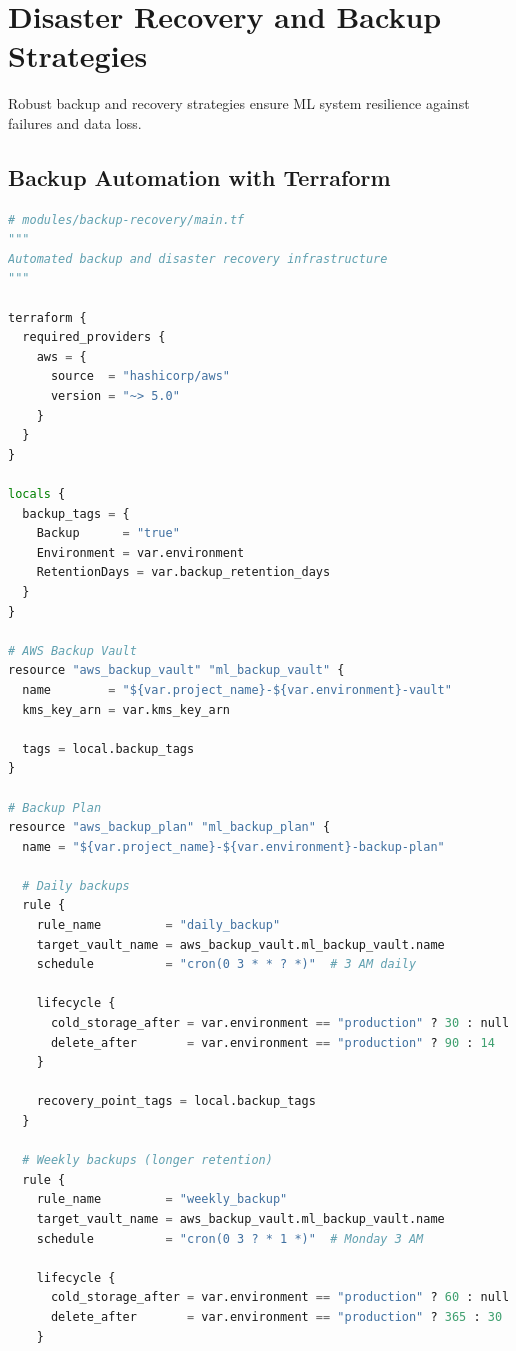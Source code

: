 \section{Disaster Recovery and Backup Strategies}

Robust backup and recovery strategies ensure ML system resilience against failures and data loss.

\subsection{Backup Automation with Terraform}

\begin{lstlisting}[language=Python, caption=Automated Backup Configuration]
# modules/backup-recovery/main.tf
"""
Automated backup and disaster recovery infrastructure
"""

terraform {
  required_providers {
    aws = {
      source  = "hashicorp/aws"
      version = "~> 5.0"
    }
  }
}

locals {
  backup_tags = {
    Backup      = "true"
    Environment = var.environment
    RetentionDays = var.backup_retention_days
  }
}

# AWS Backup Vault
resource "aws_backup_vault" "ml_backup_vault" {
  name        = "${var.project_name}-${var.environment}-vault"
  kms_key_arn = var.kms_key_arn

  tags = local.backup_tags
}

# Backup Plan
resource "aws_backup_plan" "ml_backup_plan" {
  name = "${var.project_name}-${var.environment}-backup-plan"

  # Daily backups
  rule {
    rule_name         = "daily_backup"
    target_vault_name = aws_backup_vault.ml_backup_vault.name
    schedule          = "cron(0 3 * * ? *)"  # 3 AM daily

    lifecycle {
      cold_storage_after = var.environment == "production" ? 30 : null
      delete_after       = var.environment == "production" ? 90 : 14
    }

    recovery_point_tags = local.backup_tags
  }

  # Weekly backups (longer retention)
  rule {
    rule_name         = "weekly_backup"
    target_vault_name = aws_backup_vault.ml_backup_vault.name
    schedule          = "cron(0 3 ? * 1 *)"  # Monday 3 AM

    lifecycle {
      cold_storage_after = var.environment == "production" ? 60 : null
      delete_after       = var.environment == "production" ? 365 : 30
    }


\end{lstlisting}
